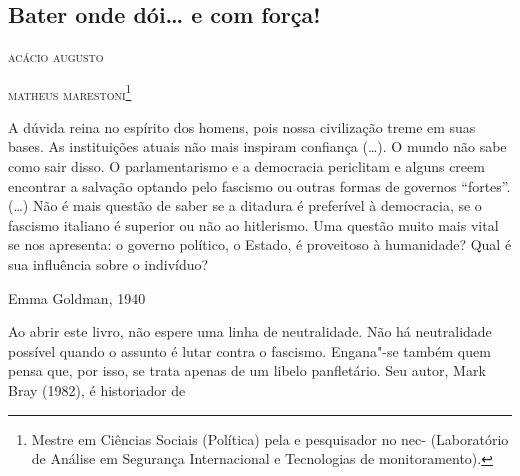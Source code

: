 \part{}

\chapter[Bater onde dói\ldots{} e com força!]{Bater onde dói\ldots{} e com força! }

\hfill{}\textsc{acácio augusto}

\hfill{}\textsc{matheus marestoni}\footnote{Mestre em Ciências Sociais (Política) pela
   e pesquisador no nec- (Laboratório de Análise em
  Segurança Internacional e Tecnologias de monitoramento).}

\bigskip

\epigraph{A dúvida reina no espírito dos homens, pois nossa civilização
treme em suas bases.
As instituições atuais não mais inspiram confiança (\ldots{}). O mundo
não sabe como sair disso. O parlamentarismo e a democracia periclitam e
alguns creem encontrar a salvação optando pelo fascismo ou outras formas
de governos ``fortes''. (\ldots{}) Não é mais questão de saber se a ditadura
é preferível à democracia, se o fascismo italiano é superior ou não ao
hitlerismo. Uma questão muito mais vital se nos apresenta:
o governo político, o Estado, é proveitoso à humanidade?
Qual é sua influência sobre o indivíduo?}{Emma Goldman, 1940}

Ao abrir este livro, não espere uma linha de neutralidade. Não há
neutralidade possível quando o assunto é lutar contra o fascismo.
Engana"-se também quem pensa que, por isso, se trata 
apenas de um libelo
panfletário. Seu autor, Mark Bray (1982), é historiador de \linebreak

